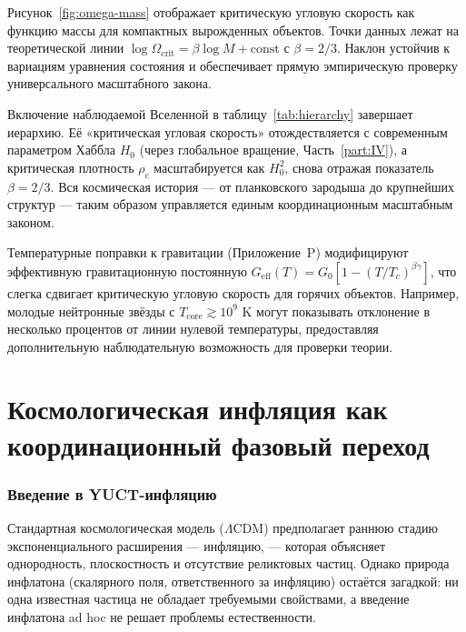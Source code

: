 \documentclass[11pt,a4paper]{article}
\begin{document}
	Рисунок~\ref{fig:omega-mass} отображает критическую угловую скорость как функцию массы для компактных вырожденных объектов. Точки данных лежат на теоретической линии \(\log\Omega_{\mathrm{crit}} = \beta \log M + \mathrm{const}\) с \(\beta = 2/3\). Наклон устойчив к вариациям уравнения состояния и обеспечивает прямую эмпирическую проверку универсального масштабного закона.
	
	Включение наблюдаемой Вселенной в таблицу~\ref{tab:hierarchy} завершает иерархию. Её «критическая угловая скорость» отождествляется с современным параметром Хаббла \(H_0\) (через глобальное вращение, Часть~\ref{part:IV}), а критическая плотность \(\rho_c\) масштабируется как \(H_0^2\), снова отражая показатель \(\beta=2/3\). Вся космическая история — от планковского зародыша до крупнейших структур — таким образом управляется единым координационным масштабным законом.
	
	Температурные поправки к гравитации (Приложение~P) модифицируют эффективную гравитационную постоянную \(G_{\mathrm{eff}}(T) = G_0[1 - (T/T_c)^{\beta\gamma}]\), что слегка сдвигает критическую угловую скорость для горячих объектов. Например, молодые нейтронные звёзды с \(T_{\mathrm{core}} \gtrsim 10^9\) K могут показывать отклонение в несколько процентов от линии нулевой температуры, предоставляя дополнительную наблюдательную возможность для проверки теории.
	
	\clearpage
	\part{Космологическая инфляция как координационный фазовый переход}
	\label{part:III}
	
	\section{Введение в YUCT-инфляцию}
	\label{sec:intro-inflation}
	
	Стандартная космологическая модель (\(\Lambda\)CDM) предполагает раннюю стадию экспоненциального расширения — инфляцию, — которая объясняет однородность, плоскостность и отсутствие реликтовых частиц. Однако природа инфлатона (скалярного поля, ответственного за инфляцию) остаётся загадкой: ни одна известная частица не обладает требуемыми свойствами, а введение инфлатона ad hoc не решает проблемы естественности.
	
\end{document}

